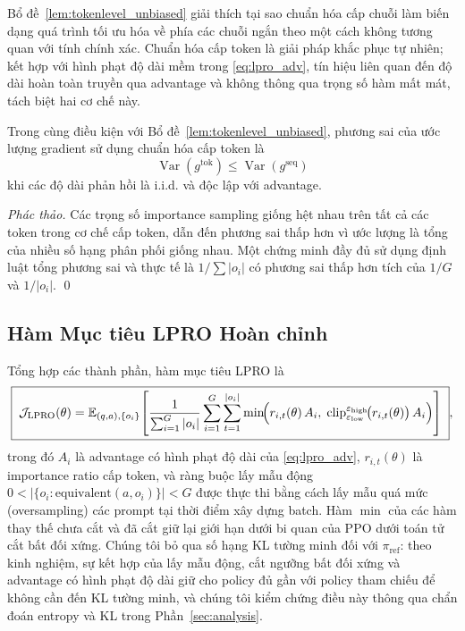 \documentclass[11pt,a4paper]{article}
\begin{document}
Bổ đề~\ref{lem:tokenlevel_unbiased} giải thích tại sao chuẩn hóa cấp chuỗi
làm biến dạng quá trình tối ưu hóa về phía các chuỗi ngắn theo một cách không tương quan với
tính chính xác. Chuẩn hóa cấp token là giải pháp khắc phục tự nhiên; kết hợp với hình phạt độ dài
mềm trong \eqref{eq:lpro_adv}, tín hiệu liên quan đến độ dài hoàn toàn truyền
qua advantage và không thông qua trọng số hàm mất mát, tách biệt hai
cơ chế này.

\begin{lemma}\label{lem:var_normalisation}
Trong cùng điều kiện với Bổ đề~\ref{lem:tokenlevel_unbiased}, phương sai của ước lượng gradient sử dụng chuẩn hóa cấp token là
\[
\operatorname{Var}(g^{\text{tok}}) \le \operatorname{Var}(g^{\text{seq}})
\]
khi các độ dài phản hồi là i.i.d. và độc lập với advantage.
\end{lemma}

\begin{proof}[Phác thảo]
Các trọng số importance sampling giống hệt nhau trên tất cả các token trong cơ chế cấp token, dẫn đến phương sai thấp hơn vì ước lượng là tổng của nhiều số hạng phân phối giống nhau. Một chứng minh đầy đủ sử dụng định luật tổng phương sai và thực tế là \(1/\sum|o_i|\) có phương sai thấp hơn tích của \(1/G\) và \(1/|o_i|\). \qed
\end{proof}

\subsection{Hàm Mục tiêu LPRO Hoàn chỉnh}

Tổng hợp các thành phần, hàm mục tiêu LPRO là
\begin{equation}
  \boxed{\;
  \mathcal{J}_{\text{LPRO}}(\theta)=
  \mathbb{E}_{(q,a),\{o_i\}}\!\left[
    \frac{1}{\sum_{i=1}^G|o_i|}\sum_{i=1}^G\sum_{t=1}^{|o_i|}
    \min\!\Bigl(r_{i,t}(\theta)\,A_i,\;
               \operatorname{clip}_{\varepsilon_{\text{low}}}^{\varepsilon_{\text{high}}}\!\bigl(r_{i,t}(\theta)\bigr)\,A_i\Bigr)
  \right]\;},
\label{eq:lpro_full}
\end{equation}
trong đó \(A_i\) là advantage có hình phạt độ dài của \eqref{eq:lpro_adv},
\(r_{i,t}(\theta)\) là importance ratio cấp token, và ràng buộc lấy mẫu động
\(0<\bigl|\{o_i:\text{equivalent}(a,o_i)\}\bigr|<G\) được thực thi bằng cách lấy mẫu quá mức (oversampling)
các prompt tại thời điểm xây dựng batch. Hàm \(\min\) của các hàm thay thế chưa cắt và đã cắt
giữ lại giới hạn dưới bi quan của PPO dưới toán tử cắt bất đối xứng. Chúng tôi bỏ qua số hạng KL tường minh đối với \(\pi_{\text{ref}}\): theo kinh nghiệm, sự kết hợp
của lấy mẫu động, cắt ngưỡng bất đối xứng và advantage có hình phạt độ dài
giữ cho policy đủ gần với policy tham chiếu để không cần đến KL tường minh,
và chúng tôi kiểm chứng điều này thông qua chẩn đoán entropy và KL trong Phần~\ref{sec:analysis}.
\end{document}
